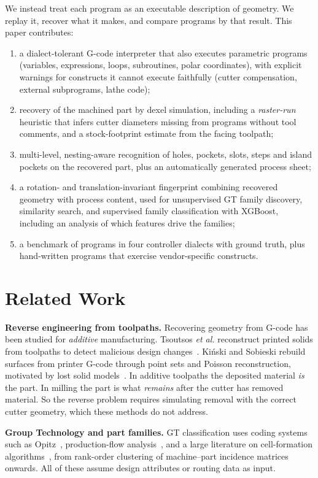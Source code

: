 \documentclass[conference]{IEEEtran}
\begin{document}
We instead treat each program as an executable description of geometry. We
replay it, recover what it makes, and compare programs by that result. This
paper contributes:
\begin{enumerate}
\item a dialect-tolerant G-code interpreter that also executes parametric
programs (variables, expressions, loops, subroutines, polar coordinates), with
explicit warnings for constructs it cannot execute faithfully (cutter
compensation, external subprograms, lathe code);
\item recovery of the machined part by dexel simulation, including a
\emph{raster-run} heuristic that infers cutter diameters missing from programs
without tool comments, and a stock-footprint estimate from the facing toolpath;
\item multi-level, nesting-aware recognition of holes, pockets, slots, steps
and island pockets on the recovered part, plus an automatically generated process sheet;
\item a rotation- and translation-invariant fingerprint combining recovered
geometry with process content, used for unsupervised GT family discovery,
similarity search, and supervised family classification with XGBoost,
including an analysis of which features drive the families;
\item a benchmark of \NProg{} programs in four controller dialects with ground
truth, plus hand-written programs that exercise vendor-specific constructs.
\end{enumerate}

\section{Related Work}
\textbf{Reverse engineering from toolpaths.} Recovering geometry from G-code has
been studied for \emph{additive} manufacturing. Tsoutsos \emph{et al.}
reconstruct printed solids from toolpaths to detect malicious design changes~\cite{tsoutsos2017}.
Kiński and Sobieski rebuild surfaces from printer G-code through point sets and
Poisson reconstruction, motivated by lost solid models~\cite{kinski2020}. In
additive toolpaths the deposited material \emph{is} the part. In milling the
part is what \emph{remains} after the cutter has removed material. So the
reverse problem requires simulating removal with the correct cutter geometry,
which these methods do not address.

\textbf{Group Technology and part families.} GT classification uses coding
systems such as Opitz~\cite{opitz1970}, production-flow analysis~\cite{burbidge1989},
and a large literature on cell-formation algorithms~\cite{selim1998,kusiak1987},
from rank-order clustering of machine--part incidence matrices~\cite{king1980}
onwards. All of these assume design attributes or routing data as input.
\end{document}
